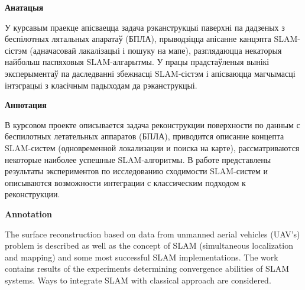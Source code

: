 \begin{center}
    {\bf Анатацыя}
\end{center}

У курсавым праекце апісваецца задача рэканструкцыі паверхні па дадзеных з беспілотных
лятальных апаратаў (БПЛА), прыводзіцца апісанне канцэпта SLAM-сістэм (адначасовай
лакалізацыі і пошуку на мапе), разглядаюцца некаторыя найбольш паспяховыя SLAM-алгарытмы.
У працы прадстаўленыя вынікі эксперыментаў па даследванні збежнасці SLAM-сістэм і
апісваюцца магчымасці інтэграцыі з класічным падыходам да рэканструкцыі.

\begin{center}
    {\bf Аннотация}
\end{center}

В курсовом проекте описывается задача реконструкции поверхности по данным с беспилотных
летательных аппаратов (БПЛА), приводится описание концепта SLAM-систем (одновременной
локализации и поиска на карте), рассматриваются некоторые наиболее успешные SLAM-алгоритмы.
В работе представлены результаты экспериментов по исследованию сходимости SLAM-систем и
описываются возможности интеграции с классическим подходом к реконструкции.

\begin{center}
    {\bf Annotation}
\end{center}

The surface reconstruction based on data from unmanned aerial vehicles (UAV's) problem is described
as well as the concept of SLAM (simultaneous localization and mapping) and some most
successful SLAM implementations.
The work contains results of the experiments determining convergence abilities of
SLAM systems. Ways to integrate SLAM with classical approach are considered.


\newpage
